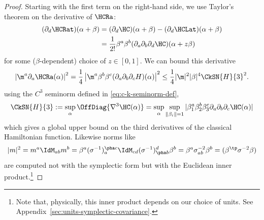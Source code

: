 \documentclass{article}
\numberwithin{equation}{section}
\begin{document}
\begin{proof}
Starting with the first term on the right-hand side, we use Taylor's theorem on the derivative of $\HCRa$:
\begin{align}\begin{split}
		\label{eq:hamiltonian-deriv-taylor}
		(\partial_d \HCRat)(\alpha+\beta) &=(\partial_d \HC)(\alpha+\beta)- (\partial_d \HCLat)(\alpha+\beta) \\
		& = \frac{1}{2!} \beta^a \beta^b (\partial_a \partial_b \partial_d \HC)(\alpha+z\beta)
\end{split}\end{align}
for some ($\beta$-dependent) choice of $z\in[0,1]$. 
We can bound this derivative
\begin{align}\begin{split}
		\label{eq:third-deriv-ham-both-sigma-bound}
		\left|\m^a \partial_a \HCRa(\alpha)\right|^2
		= \frac{1}{4} \left|\m^a  \beta^b  \beta^c (\partial_a \partial_b \partial_c H)(\alpha) \right|^2
		\le \frac{1}{4} |\m|^2 |\beta|^4 \CkSN{H}{3}^2.
\end{split}\end{align}
using the $C^3$ seminorm defined in \eqref{eq:c-k-seminorm-def}, 
\begin{align}\begin{split}\label{eq:hbar3}
		\CkSN{H}{3} := 
        \sup_\alpha \OffDiag{\nabla^3 \HC(\alpha)}
        = \sup_\alpha \sup_{\|\beta_i\|=1} |\beta_1^a \beta_2^b\beta_3^c\partial_a \partial_b \partial_c \HC(\alpha)|
\end{split}\end{align}
which gives a global upper bound on the third derivatives of the classical Hamiltonian function.  Likewise norms like 
\begin{align}
	|m|^2 = m^a \IdM_{ab} m^b = \beta^a (\sigma^{-1})_{a}^{\pha c} \IdM_{cd} (\sigma^{-1})^{d}_{\pha b} \beta^b = \beta^a \sigma^{-2}_{ab} \beta^b = (\beta^\tp \sigma^{-2} \beta)
\end{align}
are computed not with the symplectic form but with the Euclidean inner product.\footnote{Note that, physically, this inner product depends on our choice of units.  See Appendix~\ref{sec:units-symplectic-covariance}.}


\end{proof}
\end{document}
